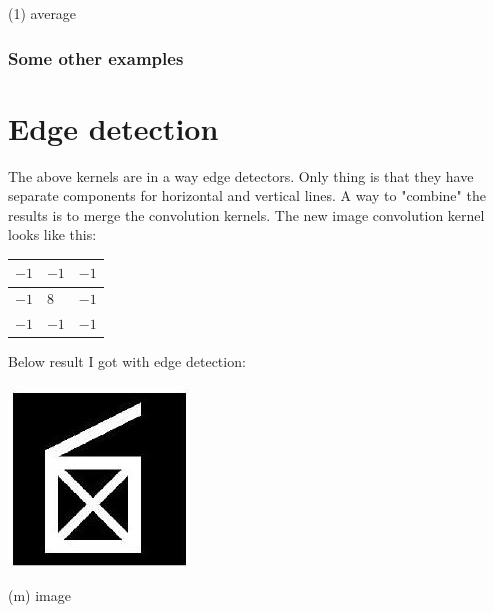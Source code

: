 \documentclass[10pt]{article}
\begin{document}
(1) average

\subsubsection{Some other examples}
\section{Edge detection}
The above kernels are in a way edge detectors. Only thing is that they have separate components for horizontal and vertical lines. A way to "combine" the results is to merge the convolution kernels. The new image convolution kernel looks like this:

\begin{tabular}{|r|l|l|}
\hline
$-1$ & $-1$ & $-1$ \\
\hline
$-1$ & 8 & $-1$ \\
\hline
$-1$ & $-1$ & $-1$ \\
\hline
\end{tabular}

Below result I got with edge detection:

\includegraphics[max width=\textwidth]{2022_01_06_b5ce182ed1bd5f482e5bg-16}

(m) image
\end{document}
